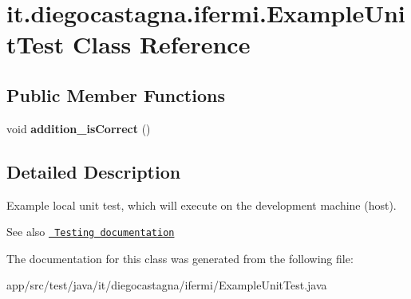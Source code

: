 \hypertarget{classit_1_1diegocastagna_1_1ifermi_1_1_example_unit_test}{}\section{it.\+diegocastagna.\+ifermi.\+Example\+Unit\+Test Class Reference}
\label{classit_1_1diegocastagna_1_1ifermi_1_1_example_unit_test}
\subsection*{Public Member Functions}
\begin{DoxyCompactItemize}
\item 
\mbox{\label{classit_1_1diegocastagna_1_1ifermi_1_1_example_unit_test_ae7253b3d8bcaaa42facc18caa4603fca}} 
void {\bfseries addition\+\_\+is\+Correct} ()
\end{DoxyCompactItemize}


\subsection{Detailed Description}
Example local unit test, which will execute on the development machine (host).

\begin{DoxySeeAlso}{See also}
\href{http://d.android.com/tools/testing}{\texttt{ Testing documentation}} 
\end{DoxySeeAlso}


The documentation for this class was generated from the following file\+:\begin{DoxyCompactItemize}
\item 
app/src/test/java/it/diegocastagna/ifermi/Example\+Unit\+Test.\+java\end{DoxyCompactItemize}
